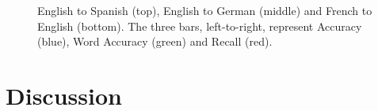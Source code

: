  
\begin{figure}[p]
\noindent{}
\noindent{}
\noindent{}
\caption{English to Spanish (top), English to German (middle) and French to English (bottom). The three bars, left-to-right, represent Accuracy (blue), Word Accuracy (green) and Recall (red).}
\label{fig:graphs}
\end{figure}

\section{Discussion}

